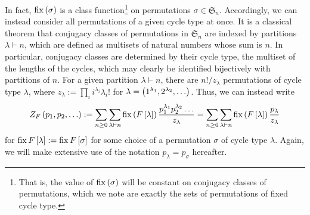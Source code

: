 \documentclass[sectionflow,singlespace,twoside,boldmathhdr]{brandiss} %
\numberwithin{section}{chapter}
\numberwithin{figure}{chapter}
\begin{document}
In fact, $\operatorname{fix} \left( {\sigma} \right)$ is a class function\footnote{That is, the value of $\operatorname{fix} \left( {\sigma} \right)$ will be constant on conjugacy classes of permutations, which we note are exactly the sets of permutations of fixed cycle type.} on permutations $\sigma \in \mathfrak{S}_{n}$.
Accordingly, we can instead consider all permutations of a given cycle type at once.
It is a classical theorem that conjugacy classes of permutations in $\mathfrak{S}_{n}$ are indexed by partitions $\lambda \vdash n$, which are defined as multisets of natural numbers whose sum is $n$.
In particular, conjugacy classes are determined by their cycle type, the multiset of the lengths of the cycles, which may clearly be identified bijectively with partitions of $n$.
For a given partition $\lambda \vdash n$, there are $n! / z_{\lambda}$ permutations of cycle type $\lambda$, where $z_{\lambda} := \prod_{i} i^{\lambda_{i}} \lambda_{i}!$ for $\lambda = \left( {1^{\lambda_{1}}, 2^{\lambda_{2}}, \dots} \right)$.
Thus, we can instead write
\begin{equation}
  \label{eq:cycinddefpart}
  Z_{F} \left( {p_{1}, p_{2}, \dots} \right) := \sum_{n \geq 0} \sum_{\lambda \vdash n} \operatorname{fix} \left( {F \left[ {\lambda} \right]} \right) \frac{p_{1}^{\lambda_{1}} p_{2}^{\lambda_{2}} \dots}{z_{\lambda}} = \sum_{n \geq 0} \sum_{\lambda \vdash n} \operatorname{fix} \left( {F \left[ {\lambda} \right]} \right) \frac{p_{\lambda}}{z_{\lambda}}
\end{equation}
for $\operatorname{fix} F \left[ {\lambda} \right] := \operatorname{fix} F \left[ {\sigma} \right]$ for some choice of a permutation $\sigma$ of cycle type $\lambda$.
Again, we will make extensive use of the notation $p_{\lambda} = p_{\sigma}$ hereafter.
\end{document}

